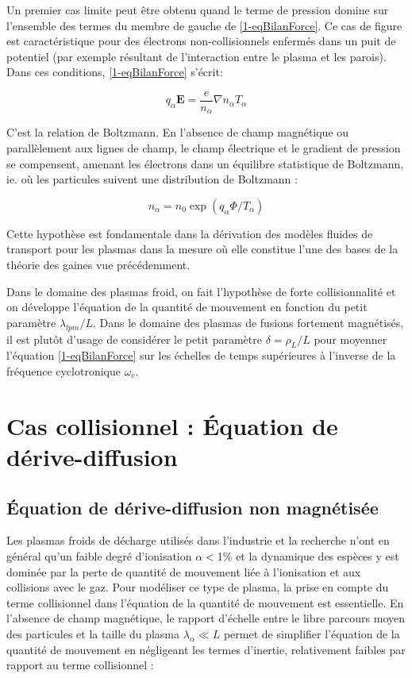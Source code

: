 \begin{refsection}
Un premier cas limite peut être obtenu quand le terme de pression domine
sur l'ensemble des termes du membre de gauche de \eqref{1-eqBilanForce}. Ce cas
de figure est caractéristique pour des électrons non-collisionnels enfermés
dans un puit de potentiel (par exemple résultant de l'interaction entre le
plasma et les parois). Dans ces conditions, \eqref{1-eqBilanForce} s'écrit:

\begin{equation}
\label{1-equilibreBoltzman}
q_\alpha\mathbf
E =\frac{e}{n_\alpha}\nabla n_\alpha T_\alpha
\end{equation}

C'est la relation de Boltzmann. En l'absence de champ magnétique
ou parallèlement aux lignes de champ, le champ électrique et le gradient de
pression se compensent, amenant les électrons dans un équilibre statistique de
Boltzmann, ie. où les particules suivent une distribution de Boltzmann :

\begin{equation}
\label{1-profilBoltzman}
n_\alpha=n_0\exp(q_\alpha \Phi/T_\alpha)
\end{equation}

Cette hypothèse est fondamentale dans la dérivation des modèles fluides de
transport pour les plasmas dans la mesure où elle constitue l'une des bases de
la théorie des gaines vue précédemment. 

Dans le domaine des plasmas
froid, on fait l'hypothèse de forte collisionnalité et on développe
l'équation de la quantité de mouvement en fonction du petit paramètre
$\lambda_{lpm}/L$.
Dans le domaine des plasmas de fusions fortement magnétisés, il est
plutôt d'usage de considérer le petit paramètre $\delta=\rho_L/L$ pour moyenner
l'équation \eqref{1-eqBilanForce} sur les échelles de temps supérieures à
l'inverse de la fréquence cyclotronique $\omega_{c}$.


\section{Cas collisionnel : Équation de dérive-diffusion}
\label{1-transportAmbipolaire}
\subsection{Équation de dérive-diffusion non magnétisée}
Les plasmas froids de décharge utilisés dans l'industrie et la recherche n'ont
en général qu'un faible degré d'ionisation $\alpha<$1\% et la dynamique des
espèces y est dominée par la perte de quantité de mouvement liée à l'ionisation
et aux collisions avec le gaz. Pour modéliser ce type de plasma, la prise en
compte du terme collisionnel dans l'équation de la quantité de mouvement est
essentielle.
En l'absence de champ magnétique, le rapport d'échelle entre le libre parcours moyen des particules
et la taille du plasma $\lambda_\alpha\ll L$ permet de simplifier l'équation de
la quantité de mouvement en négligeant les termes d'inertie, relativement
faibles par rapport au terme collisionnel :


\end{refsection}
